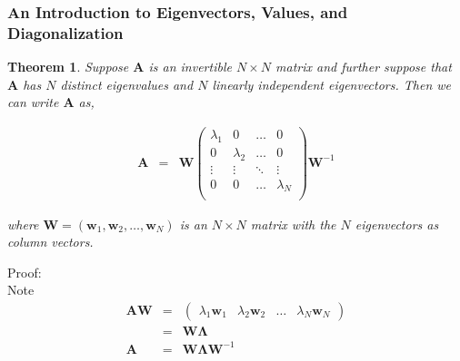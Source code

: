 \documentclass{beamer}
\newtheorem{thm}{Theorem}
\numberwithin{equation}{section}
\begin{document}
\begin{frame}
\frametitle{An Introduction to Eigenvectors, Values, and Diagonalization}


\begin{thm}
Suppose $\boldsymbol{A}$ is an \alert{invertible} $N \times N$ matrix and further suppose that $\boldsymbol{A}$ has $N$ distinct eigenvalues and $N$ linearly independent eigenvectors.  Then we can write $\boldsymbol{A}$ as, 

\begin{eqnarray}
\boldsymbol{A} &= & \boldsymbol{W}\begin{pmatrix}
\lambda_{1} & 0 & \hdots & 0 \\
0 & \lambda_{2} & \hdots & 0 \\
\vdots & \vdots & \ddots & \vdots \\
0 & 0&  \hdots & \lambda_{N}\\
\end{pmatrix}
\boldsymbol{W}^{-1} \nonumber 
\end{eqnarray}

where $\boldsymbol{W} = \left(\boldsymbol{w}_{1}, \boldsymbol{w}_{2}, \hdots, \boldsymbol{w}_{N} \right)$ is an $N \times N$ matrix with the $N$ eigenvectors as column vectors.  

\end{thm}

\end{frame}


\begin{frame}
Proof:\\

Note
\begin{eqnarray}
\boldsymbol{A}\boldsymbol{W} & = & \begin{pmatrix} \lambda_{1} \boldsymbol{w}_{1} &  \lambda_{2} \boldsymbol{w}_{2}  & \hdots  & \lambda_{N} \boldsymbol{w}_{N} \end{pmatrix} \nonumber \\
& = & \boldsymbol{W}\boldsymbol{\Lambda} \nonumber \\
\boldsymbol{A} & = & \boldsymbol{W}\boldsymbol{\Lambda} \boldsymbol{W}^{-1} \nonumber 
\end{eqnarray}



\end{frame}
\end{document}
